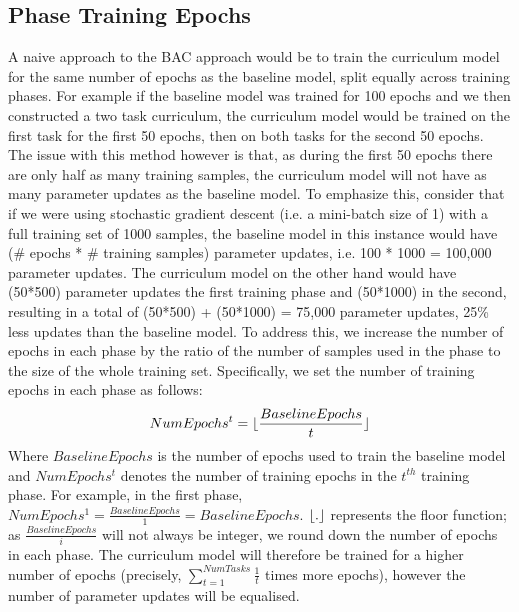 \subsection{Phase Training Epochs}
A naive approach to the BAC approach would be to train the curriculum model for the same number of epochs as the baseline model, split equally across training phases. For example if the baseline model was trained for 100 epochs and we then constructed a two task curriculum, the curriculum model would be trained on the first task for the first 50 epochs, then on both tasks for the second 50 epochs. The issue with this method however is that, as during the first 50 epochs there are only half as many training samples, the curriculum model will not have as many parameter updates as the baseline model. To emphasize this, consider that if we were using stochastic gradient descent (i.e. a mini-batch size of 1) with a full training set of 1000 samples, the baseline model in this instance would have (\# epochs * \# training samples) parameter updates, i.e. 100 * 1000 = 100,000 parameter updates. The curriculum model on the other hand would have (50*500) parameter updates the first training phase and (50*1000) in the second, resulting in a total of   (50*500) + (50*1000) = 75,000 parameter updates, 25\% less updates than the baseline model. To address this, we increase the number of epochs in each phase by the ratio of the number of samples used in the phase to the size of the whole training set. Specifically, we set the number of training epochs in each phase as follows:
\begin{equation}\label{eq:BAC_Epochs}
NumEpochs^{t} =\lfloor \frac{BaselineEpochs}{t}\rfloor
\end{equation}
Where $BaselineEpochs$ is the number of epochs used to train the baseline model and $NumEpochs^{t}$ denotes the number of training epochs in the $t^{th}$ training phase. For example, in the first phase, $NumEpochs^{1} = \frac{BaselineEpochs}{1} = BaselineEpochs$. $\lfloor.\rfloor$ represents the floor function; as $\frac{BaselineEpochs}{i}$ will not always be integer, we round down the number of epochs in each phase. The curriculum model will therefore be trained for a higher number of epochs (precisely, $\sum_{t=1}^{NumTasks}{\frac{1}{t}}$ times more epochs), however the number of parameter updates will be equalised. 

